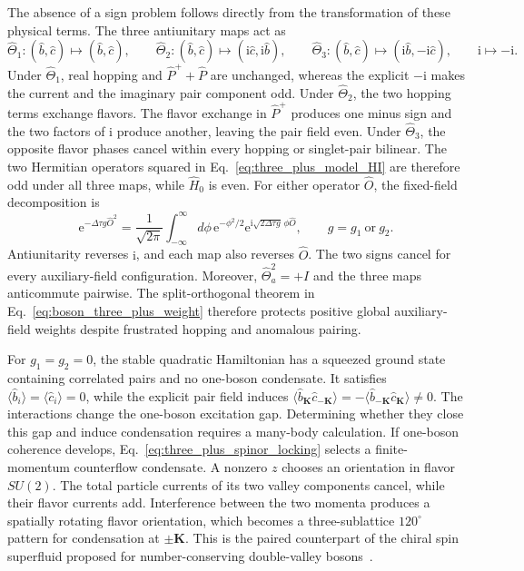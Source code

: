 \documentclass[onecolumn,aps,prb,amsmath,amssymb,superscriptaddress,longbibliography]{revtex4-2}
\newcommand{\ee}{\mathrm{e}}
\newcommand{\ii}{\mathrm{i}}
\begin{document}
The absence of a sign problem follows directly from the transformation of these physical terms.  The three antiunitary maps act as
\begin{equation}
    \widehat\Theta_1:(\hat b,\hat c)\mapsto(\hat b,\hat c),
    \qquad \widehat\Theta_2:(\hat b,\hat c)\mapsto(\ii\hat c,\ii\hat b),
    \qquad \widehat\Theta_3:(\hat b,\hat c)\mapsto(\ii\hat b,-\ii\hat c),
    \qquad \ii\mapsto-\ii.
    \label{eq:three_plus_model_TR}
\end{equation}
Under \(\widehat\Theta_1\), real hopping and \(\hat P^++\hat P\) are unchanged, whereas the explicit \(-\ii\) makes the current and the imaginary pair component odd.  Under \(\widehat\Theta_2\), the two hopping terms exchange flavors.  The flavor exchange in \(\hat P^+\) produces one minus sign and the two factors of \(\ii\) produce another, leaving the pair field even.  Under \(\widehat\Theta_3\), the opposite flavor phases cancel within every hopping or singlet-pair bilinear.  The two Hermitian operators squared in Eq.~\eqref{eq:three_plus_model_HI} are therefore odd under all three maps, while \(\hat H_0\) is even.  For either operator \(\hat O\), the fixed-field decomposition is
\begin{equation}
    \ee^{-\Delta\tau g\hat O^2}=\frac{1}{\sqrt{2\pi}}\int_{-\infty}^{\infty}d\phi\,\ee^{-\phi^2/2}\ee^{\ii\sqrt{2\Delta\tau g}\,\phi\hat O},
    \qquad g=g_1\ \text{or}\ g_2.
    \label{eq:three_plus_HS}
\end{equation}
Antiunitarity reverses \(\ii\), and each map also reverses \(\hat O\).  The two signs cancel for every auxiliary-field configuration.  Moreover, \(\widehat\Theta_a^2=+I\) and the three maps anticommute pairwise.  The split-orthogonal theorem in Eq.~\eqref{eq:boson_three_plus_weight} therefore protects positive global auxiliary-field weights despite frustrated hopping and anomalous pairing.

For \(g_1=g_2=0\), the stable quadratic Hamiltonian has a squeezed ground state containing correlated pairs and no one-boson condensate.  It satisfies \(\langle\hat b_i\rangle=\langle\hat c_i\rangle=0\), while the explicit pair field induces \(\langle\hat b_{\mathbf K}\hat c_{-\mathbf K}\rangle=-\langle\hat b_{-\mathbf K}\hat c_{\mathbf K}\rangle\ne0\).  The interactions change the one-boson excitation gap.  Determining whether they close this gap and induce condensation requires a many-body calculation.  If one-boson coherence develops, Eq.~\eqref{eq:three_plus_spinor_locking} selects a finite-momentum counterflow condensate.  A nonzero \(z\) chooses an orientation in flavor \(SU(2)\).  The total particle currents of its two valley components cancel, while their flavor currents add.  Interference between the two momenta produces a spatially rotating flavor orientation, which becomes a three-sublattice \(120^\circ\) pattern for condensation at \(\pm\mathbf K\).  This is the paired counterpart of the chiral spin superfluid proposed for number-conserving double-valley bosons~\cite{liNatuParamekanti2014chiral}.
\end{document}
